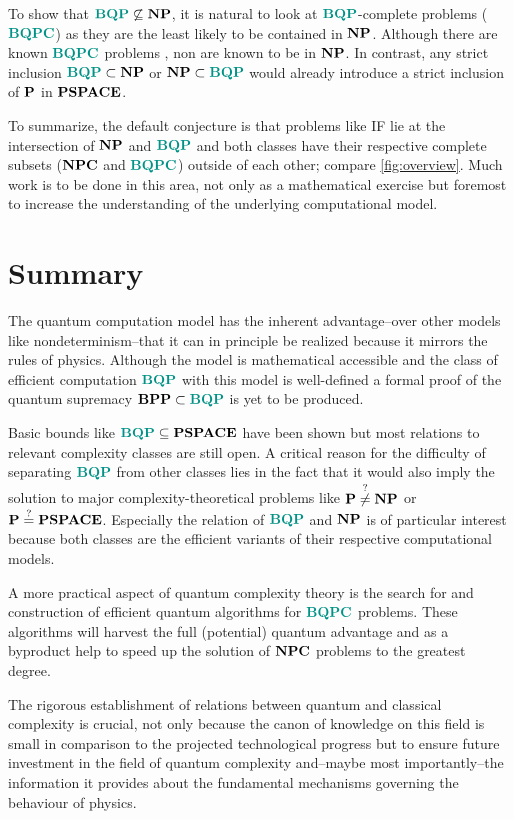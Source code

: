 To show that $\BQP\not\subseteq\NP$, it is natural to look at $\BQP$-complete problems ($\BQPC$) as they are the least likely to be contained in $\NP$.
Although there are known $\BQPC$ problems \cite{pawel_shengyu_2006}, non are known to be in $\NP$.
In contrast, any strict inclusion $\BQP\subset\NP$ or $\NP\subset\BQP$ would already introduce a strict inclusion of $\P$ in $\PSPACE$.

To summarize, the default conjecture is that problems like \ac{IF} lie at the intersection of $\NP$ and $\BQP$ and both classes have their respective complete subsets ($\NPC$ and $\BQPC$) outside of each other; compare \cref{fig:overview}.
Much work is to be done in this area, not only as a mathematical exercise but foremost to increase the understanding of the underlying computational model.

\section{Summary}
\label{Summary}

The quantum computation model has the inherent advantage--over other models like nondeterminism--that it can in principle be realized because it mirrors the rules of physics.
Although the model is mathematical accessible and the class of efficient computation $\BQP$ with this model is well-defined a formal proof of the quantum supremacy $\BPP\subset\BQP$ is yet to be produced.

Basic bounds like $\BQP\subseteq\PSPACE$ have been shown but most relations to relevant complexity classes are still open.
A critical reason for the difficulty of separating $\BQP$ from other classes lies in the fact that it would also imply the solution to major complexity-theoretical problems like $\P\overset{?}{\neq}\NP$ or $\P\overset{?}{=}\PSPACE$.
Especially the relation of $\BQP$ and $\NP$ is of particular interest because both classes are the efficient variants of their respective computational models.

A more practical aspect of quantum complexity theory is the search for and construction of efficient quantum algorithms for $\BQPC$ problems.
These algorithms will harvest the full (potential) quantum advantage and as a byproduct help to speed up the solution of $\NPC$ problems to the greatest degree.

The rigorous establishment of relations between quantum and classical complexity is crucial, not only because the canon of knowledge on this field is small in comparison to the projected technological progress but to ensure future investment in the field of quantum complexity and--maybe most importantly--the information it provides about the fundamental mechanisms governing the behaviour of physics.